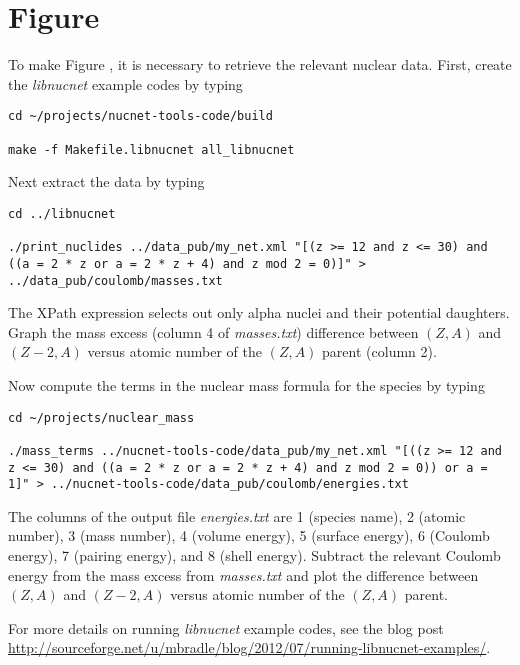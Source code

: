 \section*{Figure }
\hypertarget{sec:mass_diff}{}


\noindent To make Figure , it is necessary to retrieve the
relevant nuclear data.  First, create the {\em libnucnet} example codes by
typing
\begin{verbatim}
cd ~/projects/nucnet-tools-code/build

make -f Makefile.libnucnet all_libnucnet
\end{verbatim}
Next extract the data by typing
\begin{verbatim}
cd ../libnucnet

./print_nuclides ../data_pub/my_net.xml "[(z >= 12 and z <= 30) and ((a = 2 * z or a = 2 * z + 4) and z mod 2 = 0)]" > ../data_pub/coulomb/masses.txt
\end{verbatim}
The XPath expression selects out only alpha nuclei and their potential
daughters.  Graph the mass excess (column 4 of {\em masses.txt})
difference between $(Z,A)$ and $(Z-2,A)$ versus atomic number of the $(Z,A)$
parent (column 2).

Now compute the terms in the nuclear mass formula for the species by typing
\begin{verbatim}
cd ~/projects/nuclear_mass

./mass_terms ../nucnet-tools-code/data_pub/my_net.xml "[((z >= 12 and z <= 30) and ((a = 2 * z or a = 2 * z + 4) and z mod 2 = 0)) or a = 1]" > ../nucnet-tools-code/data_pub/coulomb/energies.txt
\end{verbatim}
The columns of the output file {\em energies.txt} are
1 (species name), 2 (atomic number), 3 (mass number), 4 (volume
energy), 5 (surface energy), 6 (Coulomb energy), 7 (pairing energy), and
8 (shell energy).  Subtract the relevant Coulomb energy from the mass excess
from {\em masses.txt} and plot the difference between $(Z,A)$ and $(Z-2,A)$
versus atomic number of the $(Z,A)$ parent.

For more details on running {\em libnucnet} example codes, see the blog post
\url{http://sourceforge.net/u/mbradle/blog/2012/07/running-libnucnet-examples/}.

\addtocounter{counter}{1}

